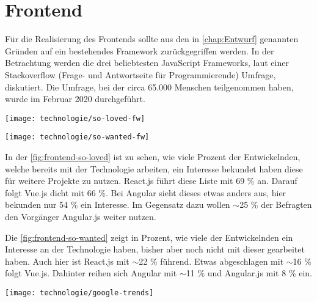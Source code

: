 \section{Frontend} \label{sec:Frontend}
Für die Realisierung des Frontends sollte aus den in \autoref{chap:Entwurf} genannten Gründen auf ein bestehendes Framework zurückgegriffen werden. In der Betrachtung werden die drei beliebtesten JavaScript Frameworks, laut einer Stackoverflow (Frage- und Antwortseite für Programmierende) Umfrage, diskutiert. Die Umfrage, bei der circa 65.000 Menschen teilgenommen haben, wurde im Februar 2020 durchgeführt. \cite{stackexchangeStackOverflowDeveloper2020}

\begin{center}
	\texttt{[image: technologie/so-loved-fw]}
	\label{fig:frontend-so-loved}
\end{center}

\begin{center}
	\texttt{[image: technologie/so-wanted-fw]}
	\label{fig:frontend-so-wanted}
\end{center}

In der \autoref{fig:frontend-so-loved} ist zu sehen, wie viele Prozent der Entwickelnden, welche bereits mit der Technologie arbeiten, ein Interesse bekundet haben diese für weitere Projekte zu nutzen. React.js führt diese Liste mit 69 \% an. Darauf folgt Vue.js dicht mit 66 \%. Bei Angular sieht dieses etwas anders aus, hier bekunden nur 54 \% ein Interesse. Im Gegensatz dazu wollen $\sim$25 \% der Befragten den Vorgänger Angular.js weiter nutzen.

Die \autoref{fig:frontend-so-wanted} zeigt in Prozent, wie viele der Entwickelnden ein Interesse an der Technologie haben, bisher aber noch nicht mit dieser gearbeitet haben. Auch hier ist React.js mit $\sim$22 \% führend. Etwas abgeschlagen mit $\sim$16 \% folgt Vue.js. Dahinter reihen sich Angular mit $\sim$11 \% und Angular.js mit 8 \% ein.

\begin{center}
	\texttt{[image: technologie/google-trends]}
	\label{fig:frontend-google-trends}
\end{center}

